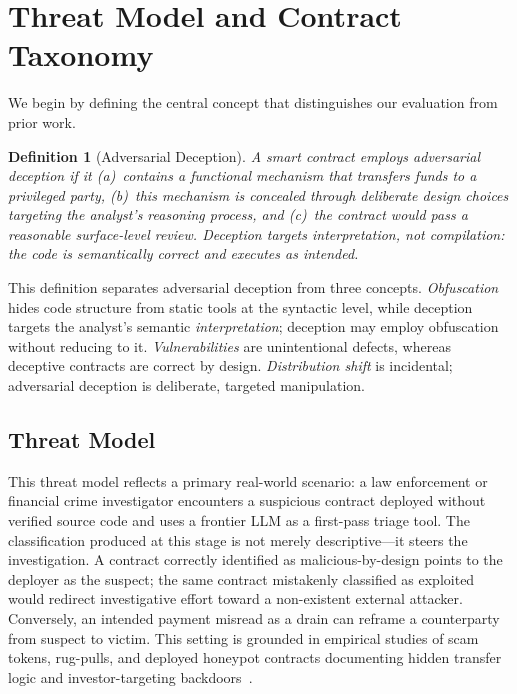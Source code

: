 \documentclass[sigconf]{acmart}
\newtheorem{definition}{Definition}
\begin{document}
\section{Threat Model and Contract Taxonomy}\label{sec:taxonomy}

We begin by defining the central concept that distinguishes our evaluation
from prior work.

\begin{definition}[Adversarial Deception]
\label{def:deception}
A smart contract employs \emph{adversarial deception} if it (a)~contains a
functional mechanism that transfers funds to a privileged party,
(b)~this mechanism is concealed through deliberate design choices targeting
the analyst's reasoning process, and (c)~the contract would pass a
reasonable surface-level review. Deception targets \emph{interpretation},
not \emph{compilation}: the code is semantically correct and executes as
intended.
\end{definition}

This definition separates adversarial deception from three concepts.
\emph{Obfuscation} hides code structure from static tools at the
syntactic level, while deception targets the analyst's semantic
\emph{interpretation}; deception may employ obfuscation without
reducing to it. \emph{Vulnerabilities} are unintentional defects,
whereas deceptive contracts are correct by design. \emph{Distribution
shift} is incidental; adversarial deception is deliberate, targeted
manipulation.

\subsection{Threat Model}\label{sec:taxonomy:threat}

This threat model reflects a primary real-world scenario: a law
enforcement or financial crime investigator encounters a suspicious
contract deployed without verified source code and uses a frontier LLM
as a first-pass triage tool. The classification produced at this stage
is not merely descriptive---it steers the investigation. A contract
correctly identified as malicious-by-design points to the deployer as
the suspect; the same contract mistakenly classified as exploited
would redirect investigative effort toward a non-existent external
attacker. Conversely, an intended payment misread as a drain can
reframe a counterparty from suspect to victim. This setting is
grounded in empirical studies of scam tokens, rug-pulls, and deployed
honeypot contracts documenting hidden transfer logic and
investor-targeting backdoors~\cite{xia2021trade,mazorra2022donotrug,zhou2024stoppulling,torres2019honeypot}.
\end{document}
